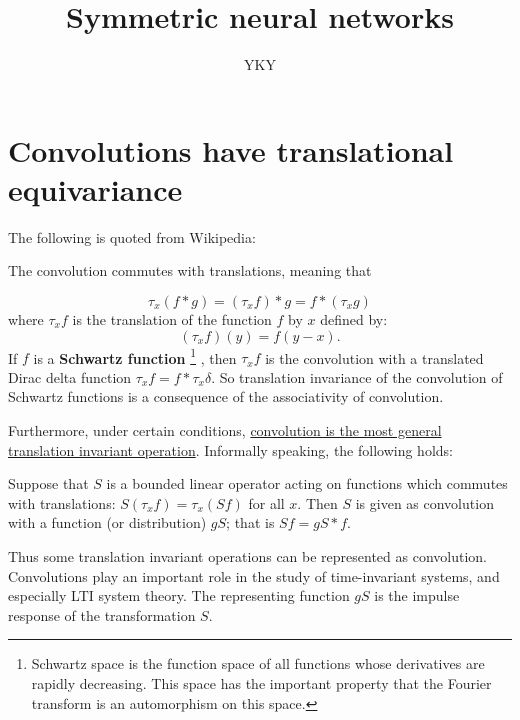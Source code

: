 

\title{Symmetric neural networks}
\author{YKY}


\maketitle

\section{Convolutions have translational equivariance}

The following is quoted from Wikipedia:

\begin{tcolorbox}[breakable]
The convolution commutes with translations, meaning that

\begin{equation}
\tau_x (f * g) = (\tau_x f) * g = {f} * (\tau_x g)
\end{equation}
where $\tau_x f$ is the translation of the function $f$ by $x$ defined by:
\begin{equation}
(\tau_x f)(y) = f( y - x ) .
\end{equation}
If $f$ is a \textbf{Schwartz function}
	\footnote{Schwartz space is the function space of all functions whose derivatives are rapidly decreasing. This space has the important property that the Fourier transform is an automorphism on this space.}
, then $\tau_x f$ is the convolution with a translated Dirac delta function $\tau_x f = f * \tau_x \delta$.  So translation invariance of the convolution of Schwartz functions is a consequence of the associativity of convolution.

Furthermore, under certain conditions, \uline{convolution is the most general translation invariant operation}.  Informally speaking, the following holds:

\begin{list}{}{}
	\item Suppose that $S$ is a bounded linear operator acting on functions which commutes with translations: $S(\tau_x f) = \tau_x(S f)$ for all $x$. Then $S$ is given as convolution with a function (or distribution) $g S$; that is $S f = g S * f$.
\end{list}

Thus some translation invariant operations can be represented as convolution. Convolutions play an important role in the study of time-invariant systems, and especially LTI system theory. The representing function $g S$ is the impulse response of the transformation $S$.


\end{tcolorbox}
